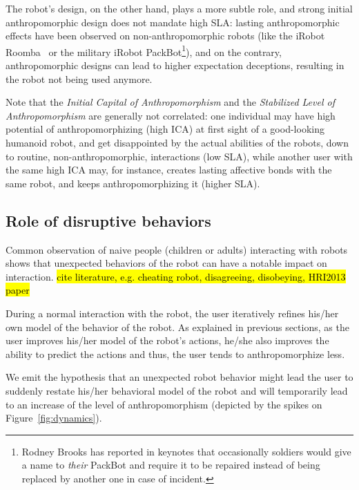 \documentclass{frontiersSCNS} %
\begin{document}
The robot's design, on the other hand, plays a more subtle role, and strong
initial anthropomorphic design does not mandate high SLA: lasting
anthropomorphic effects have been observed on non-anthropomorphic robots (like
the iRobot Roomba~\cite{fink_living_2013} or the military iRobot
PackBot\footnote{Rodney Brooks has reported in keynotes that occasionally
soldiers would give a name to \emph{their} PackBot and require it to be repaired
instead of being replaced by another one in case of incident.}), and on the
contrary, anthropomorphic designs can lead to higher expectation deceptions,
resulting in the robot not being used anymore.

Note that the \emph{Initial Capital of Anthropomorphism} and the
\emph{Stabilized Level of Anthropomorphism} are generally not correlated: one
individual may have high potential of anthropomorphizing (high ICA) at first
sight of a good-looking humanoid robot, and get disappointed by the actual
abilities of the robots, down to routine, non-anthropomorphic, interactions (low
SLA), while another user with the same high ICA may, for instance, creates
lasting affective bonds with the same robot, and keeps anthropomorphizing it
(higher SLA).


\subsection{Role of disruptive behaviors}
\label{sec:disruptive}

Common observation of naive people (children or adults) interacting with robots
shows that unexpected behaviors of the robot can have a notable impact on
interaction. \hl{cite literature, e.g. cheating robot, disagreeing, disobeying,
HRI2013 paper}

During a normal interaction with the robot, the user iteratively refines his/her
own model of the behavior of the robot. As explained in previous sections, as
the user improves his/her model of the robot's actions, he/she also improves the
ability to predict the actions and thus, the user tends to anthropomorphize
less.

We emit the hypothesis that an unexpected robot behavior might lead the user to
suddenly restate his/her behavioral model of the robot and will temporarily lead
to an increase of the level of anthropomorphism (depicted by the spikes on
Figure~\ref{fig:dynamics}).
\end{document}
